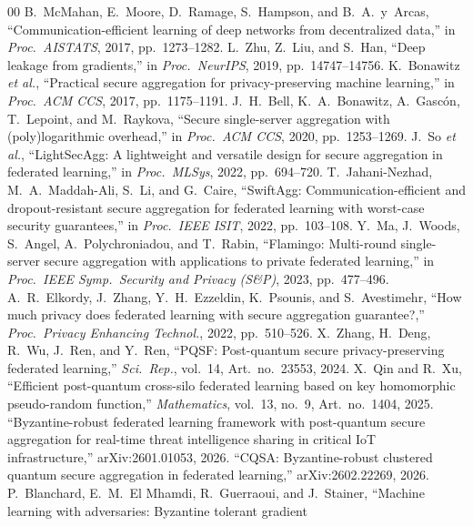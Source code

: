 \documentclass[conference]{IEEEtran}
\begin{document}
\begin{thebibliography}{00}
 B.\ McMahan, E.\ Moore, D.\ Ramage, S.\ Hampson, and
B.\ A.\ y~Arcas, ``Communication-efficient learning of deep networks from
decentralized data,'' in \emph{Proc.\ AISTATS}, 2017, pp.\ 1273--1282.
 L.\ Zhu, Z.\ Liu, and S.\ Han, ``Deep leakage from gradients,''
in \emph{Proc.\ NeurIPS}, 2019, pp.\ 14747--14756.
 K.\ Bonawitz \emph{et al.}, ``Practical secure aggregation
for privacy-preserving machine learning,'' in \emph{Proc.\ ACM CCS}, 2017,
pp.\ 1175--1191.
 J.\ H.\ Bell, K.\ A.\ Bonawitz, A.\ Gasc\'on, T.\ Lepoint, and
M.\ Raykova, ``Secure single-server aggregation with (poly)logarithmic overhead,''
in \emph{Proc.\ ACM CCS}, 2020, pp.\ 1253--1269.
 J.\ So \emph{et al.}, ``LightSecAgg: A lightweight and
versatile design for secure aggregation in federated learning,'' in
\emph{Proc.\ MLSys}, 2022, pp.\ 694--720.
 T.\ Jahani-Nezhad, M.\ A.\ Maddah-Ali, S.\ Li, and G.\ Caire,
``SwiftAgg: Communication-efficient and dropout-resistant secure aggregation for
federated learning with worst-case security guarantees,'' in \emph{Proc.\ IEEE
ISIT}, 2022, pp.\ 103--108.
 Y.\ Ma, J.\ Woods, S.\ Angel, A.\ Polychroniadou, and T.\ Rabin,
``Flamingo: Multi-round single-server secure aggregation with applications to private
federated learning,'' in \emph{Proc.\ IEEE Symp.\ Security and Privacy (S\&P)}, 2023,
pp.\ 477--496.
 A.\ R.\ Elkordy, J.\ Zhang, Y.\ H.\ Ezzeldin, K.\ Psounis,
and S.\ Avestimehr, ``How much privacy does federated learning with secure
aggregation guarantee?,'' \emph{Proc.\ Privacy Enhancing Technol.}, 2022,
pp.\ 510--526.
 X.\ Zhang, H.\ Deng, R.\ Wu, J.\ Ren, and Y.\ Ren, ``PQSF:
Post-quantum secure privacy-preserving federated learning,'' \emph{Sci.\ Rep.},
vol.\ 14, Art.\ no.\ 23553, 2024.
 X.\ Qin and R.\ Xu, ``Efficient post-quantum cross-silo
federated learning based on key homomorphic pseudo-random function,''
\emph{Mathematics}, vol.\ 13, no.\ 9, Art.\ no.\ 1404, 2025.
 ``Byzantine-robust federated learning framework with
post-quantum secure aggregation for real-time threat intelligence sharing in
critical IoT infrastructure,'' arXiv:2601.01053, 2026.
 ``CQSA: Byzantine-robust clustered quantum secure aggregation in
federated learning,'' arXiv:2602.22269, 2026.
 P.\ Blanchard, E.\ M.\ El Mhamdi, R.\ Guerraoui, and
J.\ Stainer, ``Machine learning with adversaries: Byzantine tolerant gradient

\end{thebibliography}
\end{document}
